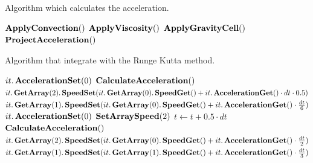 \begin{algorithm}
\caption{Algorithm which calculates the acceleration.}
\label{code:CalculateAcceleration}
\begin{algorithmic}[1]
   {}
	\State $\mathop{\textbf{ApplyConvection}}()$
	\State $\mathop{\textbf{ApplyViscosity}}()$
	\State $\mathop{\textbf{ApplyGravityCell}}()$
	\State $\mathop{\textbf{ProjectAcceleration}}()$
	\EndProcedure
 \end{algorithmic}
\end{algorithm}

\begin{algorithm}
\caption{Algorithm that integrate with the Runge Kutta method.}
\label{code:RungeKutta}
\begin{algorithmic}[1]
            \State $it.\mathop{\textbf{AccelerationSet}}(0)$
\EndFor
	\State $\mathop{\textbf{CalculateAcceleration}}()$
            \State $it.\mathop{\textbf{GetArray}}(2).\mathop{\textbf{SpeedSet}}(it.\mathop{\textbf{GetArray}}(0).\mathop{\textbf{SpeedGet}}()+it.\mathop{\textbf{AccelerationGet}}()\cdot dt \cdot 0.5)$
            \State $it.\mathop{\textbf{GetArray}}(1).\mathop{\textbf{SpeedSet}}(it.\mathop{\textbf{GetArray}}(0).\mathop{\textbf{SpeedGet}}()+it.\mathop{\textbf{AccelerationGet}}()\cdot \frac{dt}{6})$
        \EndFor
            \State $it.\mathop{\textbf{AccelerationSet}}(0)$
        \EndFor
        \State $\mathop{\textbf{SetArraySpeed}}(2)$
        \State $t\gets t+0.5\cdot dt$
        \State $\mathop{\textbf{CalculateAcceleration}}()$
            \State $it.\mathop{\textbf{GetArray}}(2).\mathop{\textbf{SpeedSet}}(it.\mathop{\textbf{GetArray}}(0).\mathop{\textbf{SpeedGet}}()+it.\mathop{\textbf{AccelerationGet}}()\cdot \frac{dt}{2})$
            \State $it.\mathop{\textbf{GetArray}}(1).\mathop{\textbf{SpeedSet}}(it.\mathop{\textbf{GetArray}}(1).\mathop{\textbf{SpeedGet}}()+it.\mathop{\textbf{AccelerationGet}}()\cdot \frac{dt}{3})$
       \EndFor

\end{algorithmic}
\end{algorithm}
